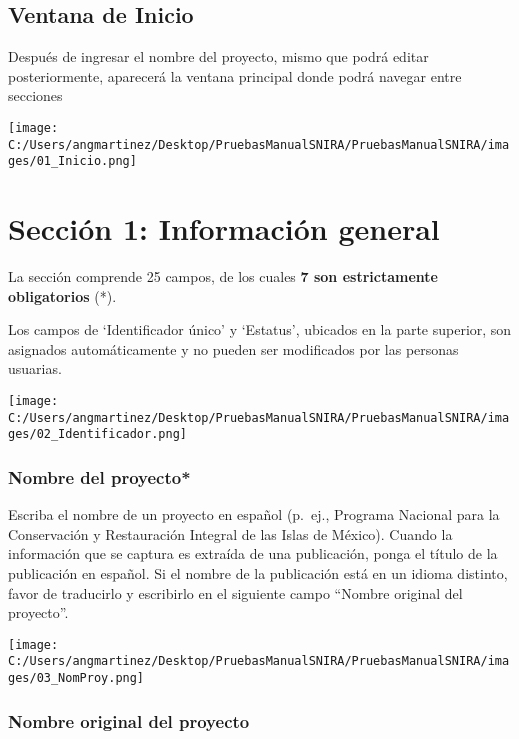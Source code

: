 \documentclass[
]{book}
\begin{document}
\hypertarget{ventana-de-inicio}{%
\section{Ventana de Inicio}\label{ventana-de-inicio}}

Después de ingresar el nombre del proyecto, mismo que podrá editar posteriormente, aparecerá la ventana principal donde podrá navegar entre secciones

\texttt{[image: C:/Users/angmartinez/Desktop/PruebasManualSNIRA/PruebasManualSNIRA/images/01\_Inicio.png]}

\hypertarget{secciuxf3n-1-informaciuxf3n-general}{%
\chapter*{Sección 1: Información general}\label{secciuxf3n-1-informaciuxf3n-general}}

La sección comprende 25 campos, de los cuales \textbf{7 son estrictamente obligatorios} (*).

Los campos de `Identificador único' y `Estatus', ubicados en la parte superior, son asignados automáticamente y no pueden ser modificados por las personas usuarias.

\texttt{[image: C:/Users/angmartinez/Desktop/PruebasManualSNIRA/PruebasManualSNIRA/images/02\_Identificador.png]}

\hypertarget{nombre-del-proyecto}{%
\subsection{Nombre del proyecto*}\label{nombre-del-proyecto}}

Escriba el nombre de un proyecto en español (p.~ej., Programa Nacional para la Conservación y Restauración Integral de las Islas de México).
Cuando la información que se captura es extraída de una publicación, ponga el título de la publicación en español.
Si el nombre de la publicación está en un idioma distinto, favor de traducirlo y escribirlo en el siguiente campo ``Nombre original del proyecto''.

\texttt{[image: C:/Users/angmartinez/Desktop/PruebasManualSNIRA/PruebasManualSNIRA/images/03\_NomProy.png]}

\hypertarget{nombre-original-del-proyecto}{%
\subsection{Nombre original del proyecto}\label{nombre-original-del-proyecto}}
\end{document}
